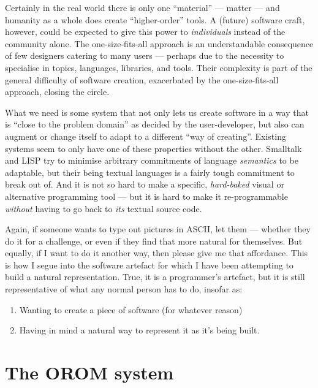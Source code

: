 \documentclass[english,submission]{programming}
\providecommand{\tightlist}{}%
\begin{document}
  Certainly in the real world there is only one ``material'' --- matter
  --- and humanity as a whole does create ``higher-order'' tools. A
  (future) software craft, however, could be expected to give this power
  to \emph{individuals} instead of the community alone. The
  one-size-fits-all approach is an understandable consequence of few
  designers catering to many users --- perhaps due to the necessity to
  specialise in topics, languages, libraries, and tools. Their complexity
  is part of the general difficulty of software creation, exacerbated by
  the one-size-fits-all approach, closing the circle.

  What we need is some system that not only lets us create software in a
  way that is ``close to the problem domain'' as decided by the
  user-developer, but also can augment or change itself to adapt to a
  different ``way of creating''. Existing systems seem to only have one of
  these properties without the other. Smalltalk and LISP try to minimise
  arbitrary commitments of language \emph{semantics} to be adaptable, but
  their being textual languages is a fairly tough commitment to break out
  of. And it is not so hard to make a specific, \emph{hard-baked} visual
  or alternative programming tool --- but it is hard to make it
  re-programmable \emph{without} having to go back to \emph{its} textual
  source code.

  Again, if someone wants to type out pictures in ASCII, let them ---
  whether they do it for a challenge, or even if they find that more
  natural for themselves. But equally, if I want to do it another way,
  then please give me that affordance. This is how I segue into the
  software artefact for which I have been attempting to build a natural
  representation. True, it is a programmer's artefact, but it is still
  representative of what any normal person has to do, insofar as:

  \begin{enumerate}
  \def\labelenumi{\alph{enumi})}
  \tightlist
  \item
    Wanting to create a piece of software (for whatever reason)
  \item
    Having in mind a natural way to represent it as it's being built.
  \end{enumerate}

  \hypertarget{the-orom-system}{%
  \section{The OROM system}\label{the-orom-system}}
\end{document}
